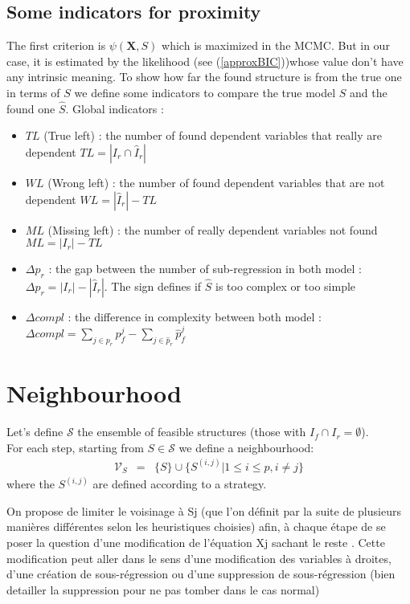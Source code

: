 \documentclass[12pt,a4paper]{report}
\begin{document}
		\subsection{Some indicators for proximity}
		The first criterion is $\psi(\boldsymbol{X},S)$ which is maximized in the MCMC. But in our case, it is estimated by the likelihood (see (\ref{approxBIC}))whose value don't have any intrinsic meaning. To show how far the found structure is from the true one in terms of $S$ we define some indicators to compare the true model $S$ and the found one $\hat{S}$.
			Global indicators :
			\begin{itemize}
				\item $TL$ (True left) : the number of found dependent variables that really are dependent $TL=|I_r\cap \hat{I}_r|$ 
				\item $WL$ (Wrong left) : the number of found dependent variables that are not dependent $WL=|\hat{I}_r|-TL$
				\item $ML$ (Missing left) : the number of really dependent variables not found $ML=|I_r|-TL$
				\item $\Delta p_r$ : the gap between the number of sub-regression in both model : $\Delta p_r=|I_r|-|\hat{I}_r|$. The sign defines if $\hat{S}$ is too complex or too simple
				\item $\Delta compl$ : the difference in complexity between both model : $\Delta compl=\sum_{j \in p_r}p_f^j-\sum_{j \in \hat{p}_r}\hat{p}_f^j$
			\end{itemize}
	\section{Neighbourhood}
	Let's define $\mathcal{S}$ the ensemble of feasible structures (those with $I_f\cap I_r=\emptyset$).
	\\
	For each step, starting from $S \in \mathcal{S}$ we define a neighbourhood:
		\begin{eqnarray}
		\mathcal{V}_{S}&=& \{S \}\cup \{ S^{(i,j)} |1\leq i \leq p, i\neq j  \} 
	\end{eqnarray}	
	where the $S^{(i,j)}$ are defined according to a strategy.

On propose de limiter le voisinage à Sj (que l'on définit par la suite de plusieurs manières différentes selon les heuristiques choisies) afin, à chaque étape de se poser la question d'une modification de l'équation Xj sachant le reste .
Cette modification peut aller dans le sens d'une modification des variables à droites, d'une création de sous-régression ou d'une suppression de sous-régression (bien detailler la suppression pour ne pas tomber dans le cas normal)
	
\end{document}
